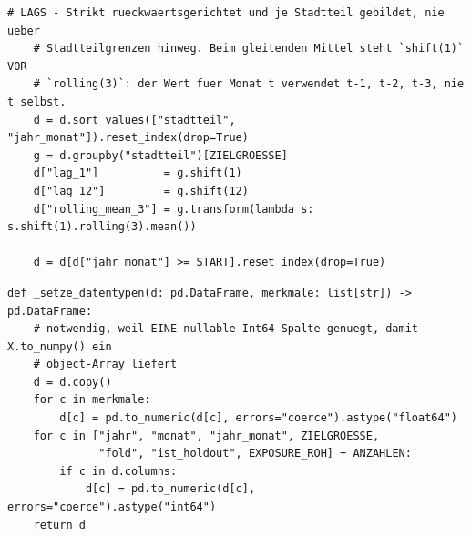 \begin{lstlisting}[style=pythonstil,
  label={lst:lags},
  caption={Bildung der Verlaufsmerkmale
           (\texttt{prep/s2\_datensaetze.py}, Z.~269--283, gekürzt)}]
    # LAGS - Strikt rueckwaertsgerichtet und je Stadtteil gebildet, nie ueber
    # Stadtteilgrenzen hinweg. Beim gleitenden Mittel steht `shift(1)` VOR
    # `rolling(3)`: der Wert fuer Monat t verwendet t-1, t-2, t-3, nie t selbst.
    d = d.sort_values(["stadtteil", "jahr_monat"]).reset_index(drop=True)
    g = d.groupby("stadtteil")[ZIELGROESSE]
    d["lag_1"]          = g.shift(1)
    d["lag_12"]         = g.shift(12)
    d["rolling_mean_3"] = g.transform(lambda s: s.shift(1).rolling(3).mean())

    d = d[d["jahr_monat"] >= START].reset_index(drop=True)
\end{lstlisting}


\begin{lstlisting}[style=pythonstil,
  label={lst:dtypes},
  caption={Vereinheitlichung auf modelltaugliche NumPy-Typen
           (\texttt{prep/s2\_datensaetze.py}, Z.~147--170, gekürzt)}]
def _setze_datentypen(d: pd.DataFrame, merkmale: list[str]) -> pd.DataFrame:
    # notwendig, weil EINE nullable Int64-Spalte genuegt, damit X.to_numpy() ein
    # object-Array liefert
    d = d.copy()
    for c in merkmale:
        d[c] = pd.to_numeric(d[c], errors="coerce").astype("float64")
    for c in ["jahr", "monat", "jahr_monat", ZIELGROESSE,
              "fold", "ist_holdout", EXPOSURE_ROH] + ANZAHLEN:
        if c in d.columns:
            d[c] = pd.to_numeric(d[c], errors="coerce").astype("int64")
    return d
\end{lstlisting}


